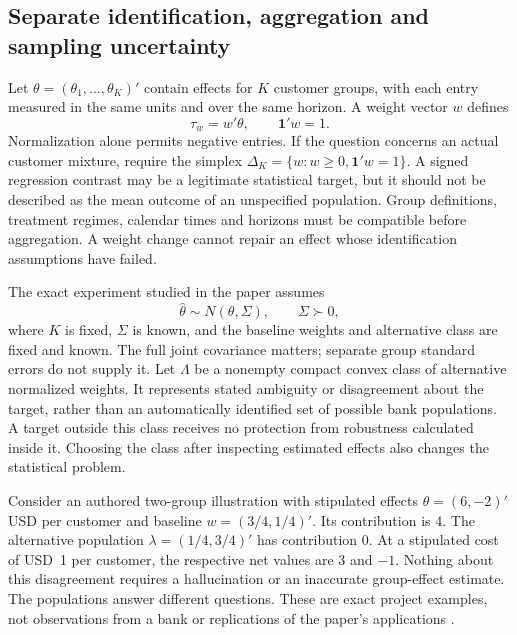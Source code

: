 \subsection{Separate identification, aggregation and sampling uncertainty}

Let $\theta=(\theta_1,\ldots,\theta_K)'$ contain effects for $K$ customer groups,
with each entry measured in the same units and over the same horizon. A weight
vector $w$ defines
\begin{equation}
 \tau_w=w'\theta,\qquad \mathbf{1}'w=1.
 \label{exec22:targets-definition}
\end{equation}
Normalization alone permits negative entries. If the question concerns an
actual customer mixture, require the simplex
$\Delta_K=\{w:w\geq0,\mathbf{1}'w=1\}$. A signed regression contrast may be a
legitimate statistical target, but it should not be described as the mean
outcome of an unspecified population. Group definitions, treatment regimes,
calendar times and horizons must be compatible before aggregation. A weight
change cannot repair an effect whose identification assumptions have failed.

The exact experiment studied in the paper assumes
\begin{equation}
 \widehat\theta\sim N(\theta,\Sigma),\qquad \Sigma\succ0,
 \label{exec22:targets-experiment}
\end{equation}
where $K$ is fixed, $\Sigma$ is known, and the baseline weights and alternative
class are fixed and known. The full joint covariance matters; separate group
standard errors do not supply it. Let $\Lambda$ be a nonempty compact convex
class of alternative normalized weights. It represents stated ambiguity or
disagreement about the target, rather than an automatically identified set of
possible bank populations. A target outside this class receives no protection
from robustness calculated inside it. Choosing the class after inspecting
estimated effects also changes the statistical problem.

Consider an authored two-group illustration with stipulated effects
$\theta=(6,-2)'$ USD per customer and baseline
$w=(3/4,1/4)'$. Its contribution is $4$. The alternative population
$\lambda=(1/4,3/4)'$ has contribution $0$. At a stipulated cost of USD~1 per
customer, the respective net values are $3$ and $-1$. Nothing about this
disagreement requires a hallucination or an inaccurate group-effect estimate.
The populations answer different questions. These are exact project examples,
not observations from a bank or replications of the paper's applications
\citep{exec22_weighted_reference}.

